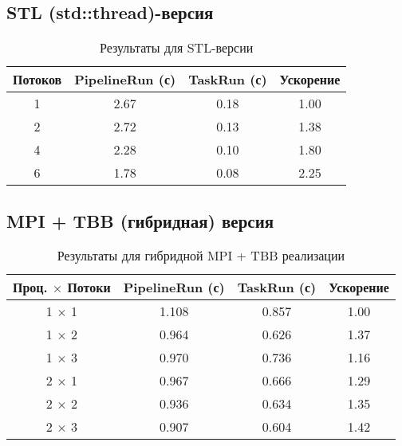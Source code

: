 \documentclass[12pt,a4paper]{extarticle}
\begin{document}
\subsection{STL (std::thread)-версия}

\begin{table}[H]
\centering
\begin{tabular}{@{}cccc@{}}
\toprule
\textbf{Потоков} & \textbf{PipelineRun (с)} & \textbf{TaskRun (с)} & \textbf{Ускорение} \\ \midrule
1               & 2.67                     & 0.18                 & 1.00               \\
2               & 2.72                     & 0.13                 & 1.38               \\
4               & 2.28                     & 0.10                 & 1.80               \\
6               & 1.78                     & 0.08                 & 2.25               \\
\bottomrule
\end{tabular}
\caption{Результаты для STL-версии}
\end{table}

\subsection{MPI + TBB (гибридная) версия}

\begin{table}[H]
\centering
\begin{tabular}{@{}cccc@{}}
\toprule
\textbf{Проц. $\times$ Потоки} & \textbf{PipelineRun (с)} & \textbf{TaskRun (с)} & \textbf{Ускорение} \\ \midrule
1 $\times$ 1                  & 1.108                    & 0.857               & 1.00               \\
1 $\times$ 2                  & 0.964                    & 0.626               & 1.37               \\
1 $\times$ 3                  & 0.970                    & 0.736               & 1.16               \\
2 $\times$ 1                  & 0.967                    & 0.666               & 1.29               \\
2 $\times$ 2                  & 0.936                    & 0.634               & 1.35               \\
2 $\times$ 3                  & 0.907                    & 0.604               & 1.42               \\
\bottomrule
\end{tabular}
\caption{Результаты для гибридной MPI + TBB реализации}
\end{table}
\end{document}
